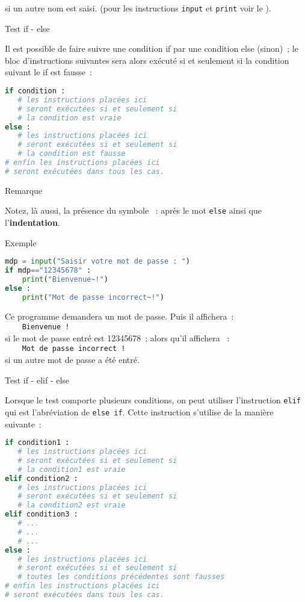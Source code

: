 si un autre nom est saisi.
\newpar
(pour les instructions \texttt{input} et \texttt{print} voir le ).
\begin{h3} Test \og if - else \fg{} \end{h3}
Il est possible de faire suivre une condition \og if \fg{} par une condition \og else \fg{} (sinon)~; le bloc d'instructions suivantes sera alors exécuté si et seulement si la condition suivant le \og if \fg{} est fausse~:
\begin{lstlisting}[language=Python]
if condition :
   # les instructions placées ici
   # seront exécutées si et seulement si 
   # la condition est vraie 
else :
   # les instructions placées ici
   # seront exécutées si et seulement si 
   # la condition est fausse
# enfin les instructions placées ici
# seront exécutées dans tous les cas.
\end{lstlisting}
\begin{h3}Remarque\end{h3}
Notez, là aussi, la présence du symbole \og~: \fg{} après le mot \texttt{else} ainsi que l'\textbf{indentation}.
\begin{h3}Exemple\end{h3}
\begin{lstlisting}[language=Python]
mdp = input("Saisir votre mot de passe : ")
if mdp=="12345678" :
    print("Bienvenue~!")
else :
    print("Mot de passe incorrect~!")
\end{lstlisting}
Ce programme demandera un mot de passe.
\newpar
Puis il affichera~:\\
\texttt{    Bienvenue~!\\}
si le mot de passe entré est 12345678~;
\newpar
alors qu'il affichera ~:\\
\texttt{    Mot de passe incorrect~! \\}
si un autre mot de passe a été entré.
\begin{h3} Test \og if - elif - else \fg{} \end{h3}
Lorsque le test comporte plusieurs conditions, on peut utiliser l'instruction \og \texttt{elif} \fg{} qui est l'abréviation de \texttt{else if}. Cette instruction s'utilise de la manière suivante~:
\begin{lstlisting}[language=Python]
if condition1 :
   # les instructions placées ici
   # seront exécutées si et seulement si 
   # la condition1 est vraie 
elif condition2 :
   # les instructions placées ici
   # seront exécutées si et seulement si 
   # la condition2 est vraie 
elif condition3 :
   # ...
   # ...
   # ...
else :
   # les instructions placées ici
   # seront exécutées si et seulement si 
   # toutes les conditions précédentes sont fausses
# enfin les instructions placées ici
# seront exécutées dans tous les cas.
\end{lstlisting}
